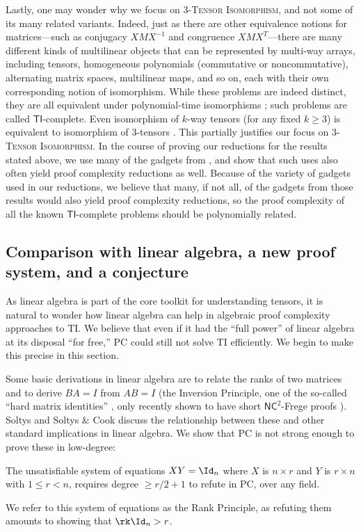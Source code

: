 Lastly, one may wonder why we focus on 3-\textsc{Tensor Isomorphism}, and not some of its many related variants. Indeed, just as there are other equivalence notions for matrices---such as conjugacy $XMX^{-1}$ and congruence $XMX^T$---there are many different kinds of multilinear objects that can be represented by multi-way arrays, including tensors, homogeneous polynomials (commutative or noncommutative), alternating matrix spaces, multilinear maps, and so on, each with their own corresponding notion of isomorphism. While these problems are indeed distinct, they are all equivalent under polynomial-time isomorphisms \cite{FGS, GQ}; such problems are called $\mathsf{TI}$-complete. Even isomorphism of $k$-way tensors (for any fixed $k \geq 3$) is equivalent to isomorphism of 3-tensors \cite{GQ}. This partially justifies our focus on \textsc{3-Tensor Isomorphism}. In the course of proving our reductions for the results stated above, we use many of the gadgets from \cite{FGS, GQ}, and show that such uses also often yield proof complexity reductions as well. Because of the variety of gadgets used in our reductions, we believe that many, if not all, of the gadgets from those results would also yield proof complexity reductions, so the proof complexity of all the known $\mathsf{TI}$-complete problems should be polynomially related.

\subsection{Comparison with linear algebra, a new proof system, and a conjecture} \label{sec:conj}
As linear algebra is part of the core toolkit for understanding tensors, it is natural to wonder how linear algebra can help in algebraic proof complexity approaches to \textsc{TI}. We believe that even if it had the ``full power'' of linear algebra at its disposal ``for free,'' PC could still not solve \textsc{TI} efficiently. We begin to make this precise in this section.

Some basic derivations in linear algebra are to relate the ranks of two matrices and to derive $BA=I$ from $AB=I$ (the Inversion Principle, one of the so-called ``hard matrix identities'' \cite{SC}, only recently shown to have short $\mathsf{NC}^2$-Frege proofs \cite{HT}). Soltys \cite{soltys} and Soltys \& Cook \cite{SC} discuss the relationship between these and other standard implications in linear algebra. We show that PC is not strong enough to prove these in low-degree:

\begin{theorem}
The unsatisfiable system of equations $XY=\Id_n$ where $X$ is $n \times r$ and $Y$ is $r \times n$ with $1 \leq r < n$, requires degree $\geq r/2+1$ to refute in PC, over any field.
\end{theorem}
We refer to this system of equations as the Rank Principle, as refuting them amounts to showing that $\rk \Id_n > r$. 

